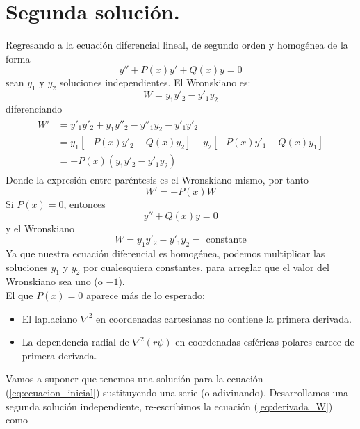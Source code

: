\section{Segunda solución.}
Regresando a la ecuación diferencial lineal, de segundo orden y homogénea de la forma
\begin{equation}
y'' + P(x) y' + Q(x) y = 0 \label{eq:ecuacion_inicial}
\end{equation}
sean $y_{1}$ y $y_{2}$ soluciones independientes. El Wronskiano es:
\begin{equation}
W = y_{1} y'_{2} - y'_{1} y_{2}
\end{equation}
diferenciando
\begin{eqnarray}
\begin{aligned}
W' &= y'_{1} y'_{2} + y_{1} y''_{2} - y''_{1} y_{2} - y'_{1} y'_{2} \\
&= y_{1} [ - P(x) y'_{2} - Q(x) y_{2}] - y_{2} [ - P(x) y'_{1} - Q(x) y_{1}] \\
&= - P(x) (y_{1} y'_{2} - y'_{1} y_{2})
\end{aligned}
\end{eqnarray}
Donde la expresión entre paréntesis es el Wronskiano mismo, por tanto
\begin{equation}
W' = - P(x) W \label{eq:derivada_W}
\end{equation}
Si $P(x)=0$, entonces
\begin{equation}
y'' + Q(x) y = 0
\end{equation}
y el Wronskiano
\begin{equation}
W = y_{1} y'_{2} - y'_{1} y_{2} = \text{ constante}
\end{equation}
Ya que nuestra ecuación diferencial es homogénea, podemos multiplicar las soluciones $y_{1}$ y $y_{2}$ por cualesquiera constantes, para arreglar que el valor del Wronskiano sea uno (o $-1$).
\\
El que $P(x)=0$ aparece más de lo esperado:
\begin{itemize}
\item El laplaciano $\nabla^{2}$ en coordenadas cartesianas no contiene la primera derivada.
\item La dependencia radial de $\nabla^{2} (r \psi)$ en coordenadas esféricas polares carece de primera derivada.
\end{itemize}
Vamos a suponer que tenemos una solución para la ecuación (\ref{eq:ecuacion_inicial}) sustituyendo una serie (o adivinando). Desarrollamos una segunda solución independiente, re-escribimos la ecuación (\ref{eq:derivada_W}) como
